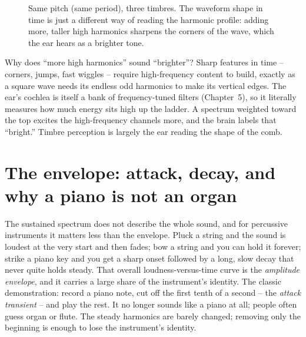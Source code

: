 \begin{figure}[H]
\centering
{}
\caption{Same pitch (same period), three timbres. The waveform shape in time is just a different way
of reading the harmonic profile: adding more, taller high harmonics sharpens the corners of the wave,
which the ear hears as a brighter tone.}
\label{ch29:fig-timbres}
\end{figure}

\begin{whybox}
Why does ``more high harmonics'' sound ``brighter''? Sharp features in time -- corners, jumps, fast
wiggles -- require high-frequency content to build, exactly as a square wave needs its endless odd
harmonics to make its vertical edges. The ear's cochlea is itself a bank of frequency-tuned filters
(Chapter~5), so it literally measures how much energy sits high up the ladder. A spectrum weighted
toward the top excites the high-frequency channels more, and the brain labels that ``bright.'' Timbre
perception is largely the ear reading the shape of the comb.
\end{whybox}

\section{The envelope: attack, decay, and why a piano is not an organ}
\label{ch29:envelope}

The sustained spectrum does not describe the whole sound, and for percussive instruments it matters less than the envelope.
Pluck a string and the sound is loudest at the very start and then fades; bow a string and you can
hold it forever; strike a piano key and you get a sharp onset followed by a long, slow decay that
never quite holds steady. That overall loudness-versus-time curve is the \emph{amplitude envelope},
and it carries a large share of the instrument's identity. The classic demonstration: record a piano note, cut
off the first tenth of a second -- the \emph{attack transient} -- and play the rest. It no longer
sounds like a piano at all; people often guess organ or flute. The steady harmonics are barely
changed; removing only the beginning is enough to lose the instrument's identity.

